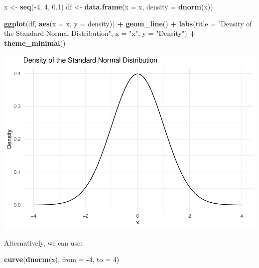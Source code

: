 \documentclass[
]{article}
\newenvironment{Shaded}{\begin{snugshade}}{\end{snugshade}}
\newcommand{\AttributeTok}[1]{\textcolor[rgb]{0.13,0.29,0.53}{#1}}
\newcommand{\DecValTok}[1]{\textcolor[rgb]{0.00,0.00,0.81}{#1}}
\newcommand{\FloatTok}[1]{\textcolor[rgb]{0.00,0.00,0.81}{#1}}
\newcommand{\FunctionTok}[1]{\textcolor[rgb]{0.13,0.29,0.53}{\textbf{#1}}}
\newcommand{\NormalTok}[1]{#1}
\newcommand{\OtherTok}[1]{\textcolor[rgb]{0.56,0.35,0.01}{#1}}
\newcommand{\SpecialCharTok}[1]{\textcolor[rgb]{0.81,0.36,0.00}{\textbf{#1}}}
\newcommand{\StringTok}[1]{\textcolor[rgb]{0.31,0.60,0.02}{#1}}
\begin{document}
\begin{Shaded}
\begin{Highlighting}[]
\NormalTok{x }\OtherTok{\textless{}{-}} \FunctionTok{seq}\NormalTok{(}\SpecialCharTok{{-}}\DecValTok{4}\NormalTok{, }\DecValTok{4}\NormalTok{, }\FloatTok{0.1}\NormalTok{)}
\NormalTok{df }\OtherTok{\textless{}{-}} \FunctionTok{data.frame}\NormalTok{(}\AttributeTok{x =}\NormalTok{ x, }\AttributeTok{density =} \FunctionTok{dnorm}\NormalTok{(x))}

\FunctionTok{ggplot}\NormalTok{(df, }\FunctionTok{aes}\NormalTok{(}\AttributeTok{x =}\NormalTok{ x, }\AttributeTok{y =}\NormalTok{ density)) }\SpecialCharTok{+}
  \FunctionTok{geom\_line}\NormalTok{() }\SpecialCharTok{+}
  \FunctionTok{labs}\NormalTok{(}\AttributeTok{title =} \StringTok{"Density of the Standard Normal Distribution"}\NormalTok{,}
       \AttributeTok{x =} \StringTok{"x"}\NormalTok{, }\AttributeTok{y =} \StringTok{"Density"}\NormalTok{) }\SpecialCharTok{+}
  \FunctionTok{theme\_minimal}\NormalTok{()}
\end{Highlighting}
\end{Shaded}

\includegraphics{Probability-Distributions_files/figure-latex/unnamed-chunk-8-1.pdf}

Alternatively, we can use:

\begin{Shaded}
\begin{Highlighting}[]
\FunctionTok{curve}\NormalTok{(}\FunctionTok{dnorm}\NormalTok{(x), }\AttributeTok{from =} \SpecialCharTok{{-}}\DecValTok{4}\NormalTok{, }\AttributeTok{to =} \DecValTok{4}\NormalTok{)}
\end{Highlighting}
\end{Shaded}
\end{document}
